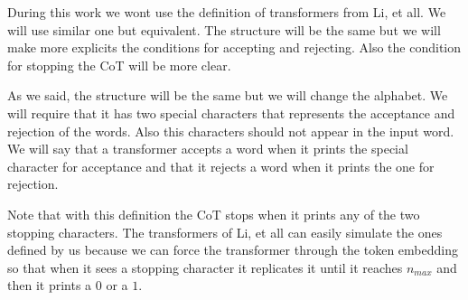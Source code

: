 During this work we wont use the definition of transformers from Li, et all. We will use similar one but equivalent.
The structure will be the same but we will make more explicits the conditions for accepting and rejecting. Also the condition for stopping the CoT will be more clear.

As we said, the structure will be the same but we will change the alphabet. We will require that it has two special characters that represents the acceptance and rejection of the words. Also this characters should not appear in the input word.  We will say that a transformer accepts a word when it prints the special character for acceptance and that it rejects a word when it prints the one for rejection. 

Note that with this definition the CoT stops when it prints any of the two stopping characters. The transformers of Li, et all can easily simulate the ones defined by us because we can force the transformer through the token embedding so that when it sees a stopping character it replicates it until it reaches $n_{max}$ and then it prints a $0$ or a $1$. 





